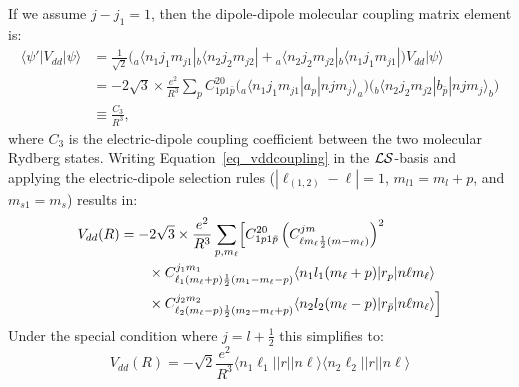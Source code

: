 If we assume $j - j_1 = 1$, then the dipole-dipole molecular coupling matrix element is:
\begin{equation}
  \label{eq_vddcoupling}
  \begin{split}
    \langle\psi'|V_{dd}|\psi\rangle
      &= \frac{1}{\sqrt{2}}\bigg( {_a}\langle n_1 j_1 m_{j1}| {_b}\langle n_2 j_2 m_{j2}| + {_a}\langle n_2 j_2 m_{j2}| {_b}\langle n_1 j_1 m_{j1}| \bigg) V_{dd}|\psi\rangle \\
      &= -2\sqrt{3}\times\frac{e^2}{R^3}\sum_pC_{1p1\bar{p}}^{20}\bigg({_a}\langle n_1 j_1 m_{j1}| a_p|njm_j\rangle_a\bigg)\bigg({_b}\langle n_2 j_2 m_{j2}| b_{\bar{p}}|njm_j\rangle_b\bigg)\\
      &\equiv \frac{C_3}{R^3},
  \end{split}
\end{equation}
where $C_3$ is the electric-dipole coupling coefficient between the two molecular Rydberg states.
Writing Equation~\ref{eq_vddcoupling} in the $\cal LS$-basis and applying the electric-dipole selection rules ($|\ell_{(1,2)}-\ell|=1$, $m_{l1}=m_l+p$, and $m_{s1}=m_s$) results in:
\begin{equation}
  \label{eq_vddls}
  \begin{split}
    V_{dd}(R) &= -2\sqrt{3}\times\frac{e^2}{R^3}\sum_{p,m_{\ell}} \Bigl[ C_{1p1\bar{p}}^{20} \left(C_{\ell m_{\ell}\frac{1}{2}(m-m_{\ell})}^{jm}\right)^2 \\
                &\qquad \times C_{\ell_{1}(m_{\ell}+p)\frac{1}{2}(m_1-m_{\ell}-p)}^{j_1m_1}\langle n_1l_1(m_{\ell}+p)|r_p|n\ell m_{\ell}\rangle\\
                &\qquad \times C_{\ell_{2}(m_{\ell}-p)\frac{1}{2}(m_2-m_{\ell}+p)}^{j_2m_2}\langle n_2l_2(m_{\ell}-p)|r_{\bar{p}}|n\ell m_{\ell} \rangle \Bigr]
  \end{split}
\end{equation}
Under the special condition where $j=l+\frac{1}{2}$ this simplifies to:
\begin{equation}
  \label{eq_vddls}
    V_{dd}(R) = -\sqrt{2}\frac{e^2}{R^3}
               \langle n_1 \ell_1|| r || n \ell \rangle \langle n_2 \ell_2 ||r || n \ell \rangle
\end{equation}

